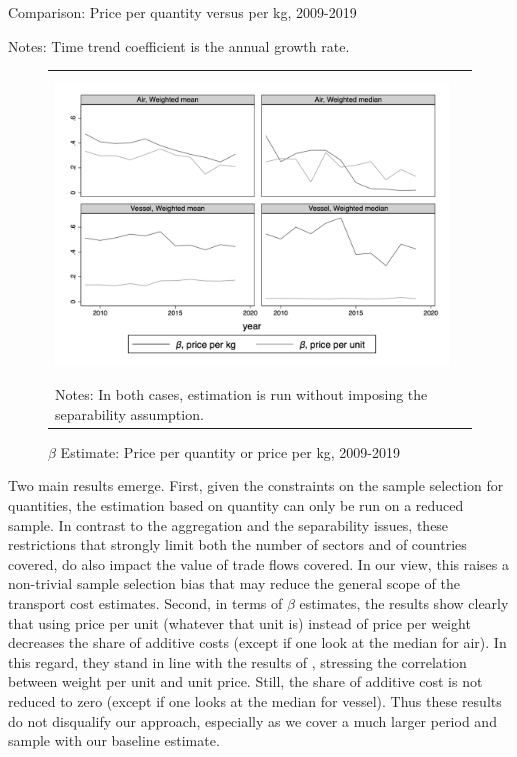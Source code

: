 \documentclass[a4paper,11pt]{article}
\begin{document}
\begin{table}[htbp]
	\caption{Comparison: Price per quantity versus per kg, 2009-2019}
	\begin{center}		
		
%		
{\parbox[l]{12cm}{ \vspace{4pt}\footnotesize{Notes: Time trend coefficient is the annual growth rate.}}}
\end{center}
	\label{tab_comp_wgt_qty}%
\end{table}%

\begin{figure}[htbp]
	\caption{$\beta$ Estimate: Price per quantity or price per kg, 2009-2019}
	\begin{center}
		\begin{tabular}{cc}
			\includegraphics[height=8cm]{../../revised_article/scatter_chronology_non_separe_wgt_non_separe_qy.png}\\
			\multicolumn{2}{l}{{\footnotesize Notes: In both cases, estimation is run without imposing the separability assumption.}}
		\end{tabular}
	\end{center}
		\label{graph_comp_wgt_qty}%
\end{figure}

Two main results emerge. First, given the constraints on the sample selection for quantities, the estimation based on quantity can only be run on a reduced sample. In contrast to the aggregation and the separability issues, these restrictions that strongly limit both the number of sectors and of countries covered, do also impact the value of trade flows covered. In our view, this raises a non-trivial sample selection bias that may reduce the general scope of the transport cost estimates. Second, in terms of $\beta$ estimates, the results show clearly that using price per unit (whatever that unit is) instead of price per weight decreases the share of additive costs (except if one look at the median for air). In this regard, they stand in line with the results of \cite{Lashkaripour_JIE2020}, stressing the correlation between weight per unit and unit price. Still, the share of additive cost is not reduced to zero (except if one looks at the median for vessel). Thus these results do not disqualify our approach, especially as we cover a much larger period and sample with our baseline estimate.
\end{document}
